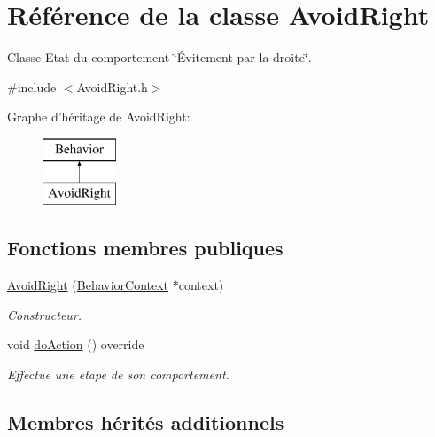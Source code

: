 \hypertarget{class_avoid_right}{\section{Référence de la classe Avoid\-Right}
\label{class_avoid_right}
}


Classe Etat du comportement \char`\"{}Évitement par la droite\char`\"{}.  




{\ttfamily \#include $<$Avoid\-Right.\-h$>$}

Graphe d'héritage de Avoid\-Right\-:\begin{figure}[H]
\begin{center}
\leavevmode
\includegraphics[height=2.000000cm]{class_avoid_right}
\end{center}
\end{figure}
\subsection*{Fonctions membres publiques}
{\bf }\par
\begin{DoxyCompactItemize}
\item 
\hyperlink{class_avoid_right_a0ab41a5c688b5cc3f66bc107feb03014}{Avoid\-Right} (\hyperlink{class_behavior_context}{Behavior\-Context} $\ast$context)
\begin{DoxyCompactList}\small\item\em Constructeur. \end{DoxyCompactList}\item 
\hypertarget{class_avoid_right_a58ad8275468349660d17d26867e33225}{void \hyperlink{class_avoid_right_a58ad8275468349660d17d26867e33225}{do\-Action} () override}\label{class_avoid_right_a58ad8275468349660d17d26867e33225}

\begin{DoxyCompactList}\small\item\em Effectue une etape de son comportement. \end{DoxyCompactList}\end{DoxyCompactItemize}

\subsection*{Membres hérités additionnels}


